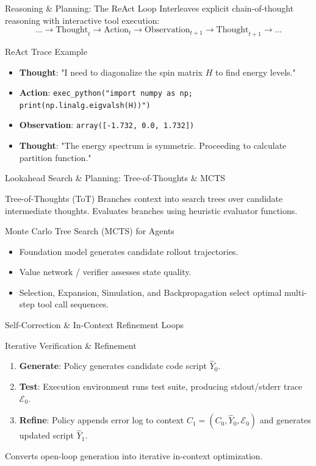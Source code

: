 \documentclass[10pt, aspectratio=169]{beamer}
\begin{document}
\begin{frame}{Reasoning \& Planning: The ReAct Loop}
  Interleaves explicit chain-of-thought reasoning with interactive tool execution:
  $$\dots \to \text{Thought}_t \to \text{Action}_t \to \text{Observation}_{t+1} \to \text{Thought}_{t+1} \to \dots$$

  \begin{block}{ReAct Trace Example}
    \begin{itemize}
      \item \textbf{Thought}: "I need to diagonalize the spin matrix $H$ to find energy levels."
      \item \textbf{Action}: \texttt{exec\_python("import numpy as np; print(np.linalg.eigvalsh(H))")}
      \item \textbf{Observation}: \texttt{array([-1.732, 0.0, 1.732])}
      \item \textbf{Thought}: "The energy spectrum is symmetric. Proceeding to calculate partition function."
    \end{itemize}
  \end{block}
\end{frame}

\begin{frame}{Lookahead Search \& Planning: Tree-of-Thoughts \& MCTS}
  \begin{block}{Tree-of-Thoughts (ToT)}
    Branches context into search trees over candidate intermediate thoughts. Evaluates branches using heuristic evaluator functions.
  \end{block}

  \begin{block}{Monte Carlo Tree Search (MCTS) for Agents}
    \begin{itemize}
      \item Foundation model generates candidate rollout trajectories.
      \item Value network / verifier assesses state quality.
      \item Selection, Expansion, Simulation, and Backpropagation select optimal multi-step tool call sequences.
    \end{itemize}
  \end{block}
\end{frame}

\begin{frame}{Self-Correction \& In-Context Refinement Loops}
  \begin{block}{Iterative Verification & Refinement}
    \begin{enumerate}
      \item \textbf{Generate}: Policy generates candidate code script $\hat{Y}_0$.
      \item \textbf{Test}: Execution environment runs test suite, producing stdout/stderr trace $\mathcal{E}_0$.
      \item \textbf{Refine}: Policy appends error log to context $C_1 = (C_0, \hat{Y}_0, \mathcal{E}_0)$ and generates updated script $\hat{Y}_1$.
    \end{enumerate}
  \end{block}
  Converts open-loop generation into iterative in-context optimization.
\end{frame}
\end{document}
